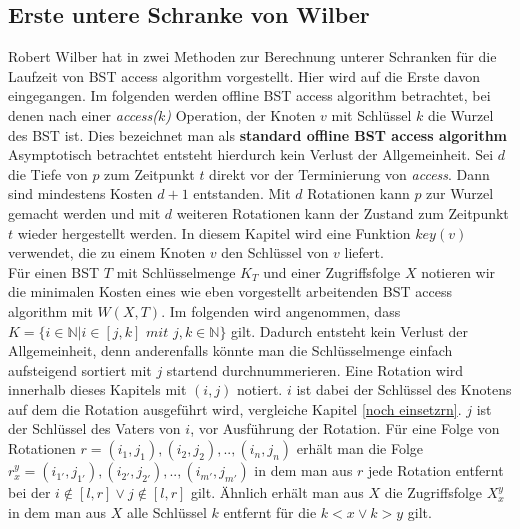 \documentclass[a4paper,12pt]{article}
\begin{document}
\subsection{Erste untere Schranke von Wilber}
Robert Wilber hat in \cite{wilberLowerBounds} zwei Methoden zur Berechnung unterer Schranken für die Laufzeit von BST access algorithm vorgestellt. Hier wird auf die Erste davon eingegangen. Im folgenden werden offline BST access algorithm betrachtet, bei denen nach einer \textit{access($k$)} Operation, der Knoten $v$ mit Schlüssel $k$ die Wurzel des BST ist. Dies bezeichnet man als \textbf{standard offline BST access algorithm } Asymptotisch betrachtet entsteht hierdurch kein Verlust der Allgemeinheit. Sei $d$ die Tiefe von $p$ zum Zeitpunkt $t$ direkt vor der Terminierung von \textit{access}. Dann sind mindestens Kosten $d + 1$ entstanden. Mit $d$ Rotationen kann $p$ zur Wurzel gemacht werden und mit $d$ weiteren Rotationen kann der Zustand zum Zeitpunkt $t$ wieder hergestellt werden. In diesem Kapitel wird eine Funktion $\mathit{key}(v)$ verwendet, die zu einem Knoten $v$ den Schlüssel von $v$ liefert.\\
Für einen BST $T$ mit Schlüsselmenge $K_T$ und einer Zugriffsfolge $X$ notieren wir die minimalen Kosten eines wie eben vorgestellt arbeitenden BST access algorithm mit $W(X, T)$. Im folgenden wird angenommen, dass \\
$K = \{  i \in \mathbb{N} \vert i \in \left[j,k\right] \textit{ mit } j,k \in  \mathbb{N} \} $ gilt. Dadurch entsteht kein Verlust der Allgemeinheit, denn anderenfalls könnte man die Schlüsselmenge einfach aufsteigend sortiert mit $j$ startend durchnummerieren. Eine Rotation wird innerhalb dieses Kapitels mit $\left(i, j\right)$ notiert. $i$ ist dabei der Schlüssel des Knotens auf dem die Rotation ausgeführt wird, vergleiche Kapitel \ref{noch einsetzrn}. $j$ ist der Schlüssel des Vaters von $i$, vor Ausführung der Rotation. Für eine Folge von Rotationen $r = \left(i_1,j_1 \right),\left(i_2,j_2 \right),..,\left(i_n,j_n \right)$ erhält man die Folge  $r^y_x = \left(i_{1'},j_{1'}\right),\left(i_{2'},j_{2'} \right),..,\left(i_{m'},j_{m'} \right)$  in dem man aus $r$ jede Rotation entfernt bei der $i\notin \left[l,r\right] \lor j\notin \left[l,r\right]$ gilt. Ähnlich erhält man aus $X$ die Zugriffsfolge $X^y_x$ in dem man aus $X$ alle Schlüssel $k$ entfernt für die $k < x  \lor k > y$ gilt.
\end{document}
